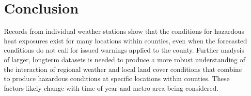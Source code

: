 \documentclass{ametsoc}
\begin{document}
\section{Conclusion}\label{section:conclusion}
Records from individual weather stations show that the conditions for hazardous heat exposures exist for many locations within counties, even when the forecasted conditions do not call for issued warnings applied to the county. Further analysis of larger, longterm datasets is needed to produce a more robust understanding of the interaction of regional weather and local land cover conditions that combine to produce hazardous conditions at specific locations within counties. These factors likely change with time of year and metro area being considered. 



%

%





\end{document}
